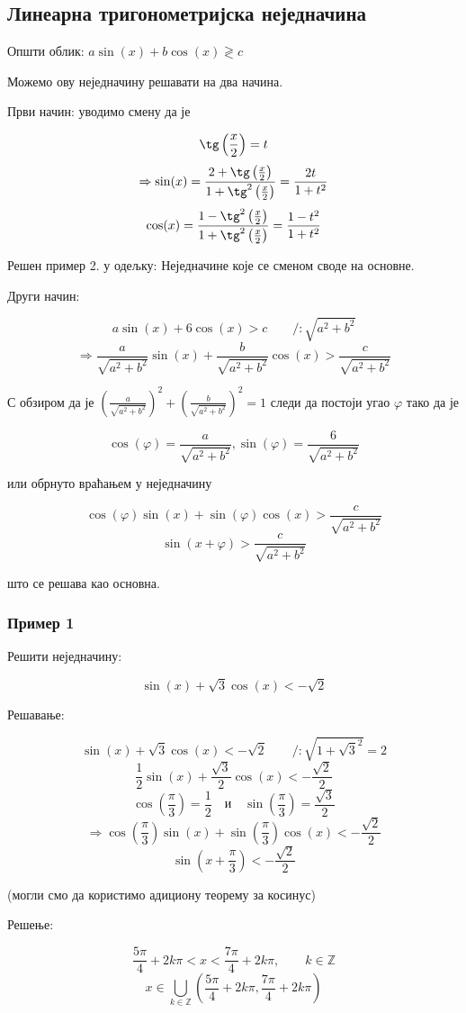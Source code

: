 \documentclass[../diplomski.tex]{subfiles}
\begin{document}
\subsection{Линеарна тригонометријска неједначина}

Општи облик: $a\sin(x)+b\cos(x)\gtrless c$

Можемо ову неједначину решавати на два начина.

Први начин: уводимо смену да је

\[\tg\left(\frac{x}{2}\right)=t\]
\[\Rightarrow\sin(x)=\frac{2+\tg\left(\frac{x}{2}\right)}{1+\tg^{2}\left(\frac{x}{2}\right)}=\frac{2t}{1+t^{2}}\]
\[\cos(x)=\frac{1-\tg^{2}\left(\frac{x}{2}\right)}{1+\tg^{2}\left(\frac{x}{2}\right)}=\frac{1-t^{2}}{1+t^{2}}\]

Решен пример 2. у одељку: Неједначине које се сменом своде на основне.

Други начин:

\[a\sin(x)+6\cos(x)>c\qquad/:\sqrt{a^{2}+b^{2}}\]
\[\Rightarrow\frac{a}{\sqrt{a^{2}+b^{2}}}\sin(x)+\frac{b}{\sqrt{a^{2}+b^{2}}}\cos(x)>\frac{c}{\sqrt{a^{2}+b^{2}}}\]

С обзиром да је $\left(\frac{a}{\sqrt{a^{2}+b^{2}}}\right)^{2}+\left(\frac{b}{\sqrt{a^{2}+b^{2}}}\right)^{2}=1$
следи да постоји угао $\varphi$ тако да је

\[\cos(\varphi)=\frac{a}{\sqrt{a^{2}+b^{2}}},\sin(\varphi)=\frac{6}{\sqrt{a^{2}+b^{2}}}\]

или обрнуто враћањем у неједначину

\[\cos(\varphi)\sin(x)+\sin(\varphi)\cos(x)>\frac{c}{\sqrt{a^{2}+b^{2}}}\]
\[\sin(x+\varphi)>\frac{c}{\sqrt{a^{2}+b^{2}}}\]

што се решава као основна.

\subsubsection{Пример 1}

Решити неједначину:

\[\sin(x)+\sqrt{3}\cos(x)<-\sqrt{2}\]

Решавање:

\[\sin(x)+\sqrt{3}\cos(x)<-\sqrt{2}\qquad/:\sqrt{1+\sqrt{3}^{2}}=2\]
\[\frac{1}{2}\sin(x)+\frac{\sqrt{3}}{2}\cos(x)<-\frac{\sqrt{2}}{2}\]
\[\cos\left(\frac{\pi}{3}\right)=\frac{1}{2}\quad\text{и}\quad\sin\left(\frac{\pi}{3}\right)=\frac{\sqrt{3}}{2}\]
\[\Rightarrow\cos\left(\frac{\pi}{3}\right)\sin(x)+\sin\left(\frac{\pi}{3}\right)\cos(x)<-\frac{\sqrt{2}}{2}\]
\[\sin\left(x+\frac{\pi}{3}\right)<-\frac{\sqrt{2}}{2}\]

(могли смо да користимо адициону теорему за косинус)

Решење:

\[\frac{5\pi}{4}+2k\pi<x<\frac{7\pi}{4}+2k\pi,\qquad k\in\mathbb{Z}\]
\[x\in\bigcup_{k\in\mathbb{Z}}\left(\frac{5\pi}{4}+2k\pi,\frac{7\pi}{4}+2k\pi\right)\]
\end{document}
